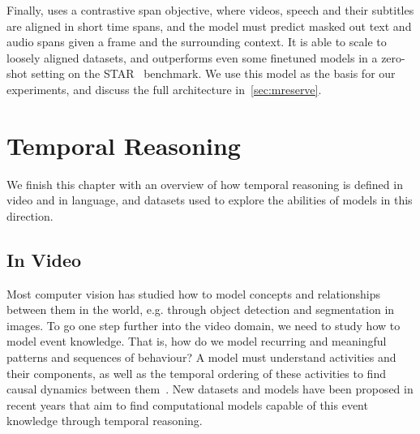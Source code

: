 
Finally, \citet{zellers2022mreserve} uses a contrastive span objective, where
videos, speech and their subtitles are aligned in short time spans, and the
model must predict masked out text and audio spans given a frame and the
surrounding context. It is able to scale to loosely aligned datasets, and
outperforms even some finetuned models in a zero-shot setting on the
STAR~\citep{wu2021star} benchmark. We use this model as the basis for our
experiments, and discuss the full architecture in~\cref{sec:mreserve}.


\section{Temporal Reasoning}
\label{sec:tempreason}

We finish this chapter with an overview of how temporal reasoning is defined in
video and in language, and datasets used to explore the abilities of models in
this direction.

\subsection{In Video}
\label{ssec:tempvid}
Most computer vision has studied how to model concepts and relationships
between them in the world, e.g. through object detection and segmentation in
images. To go one step further into the video domain, we need to study how to
model event knowledge. That is, how do we model recurring and meaningful
patterns and sequences of behaviour? A model must understand activities and
their components, as well as the temporal ordering of these activities to find
causal dynamics between them~\citep{elman2019event}. New datasets and models
have been proposed in recent years that aim to find computational models
capable of this event knowledge through temporal reasoning. 

